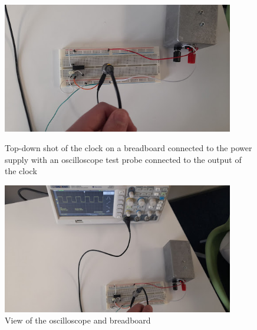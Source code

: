 \begin{figure} [H]
    \centering
    \begin{minipage}[t]{0.45\textwidth}
        \centering
        \includegraphics[width=0.9\textwidth]{images/clockTesting1.jpg}
        \caption{Top-down shot of the clock on a breadboard connected to the power supply with an oscilloscope test probe connected to the output of the clock}
        \label{fig:clockTesting1}
    \end{minipage}\hfill
    \begin{minipage}[t]{0.45\textwidth}
        \centering
        \includegraphics[width=0.9\textwidth]{images/clockTesting2.jpg}
        \caption{View of the oscilloscope and breadboard}
         \label{fig:clockTesting2}
    \end{minipage}
\end{figure}
